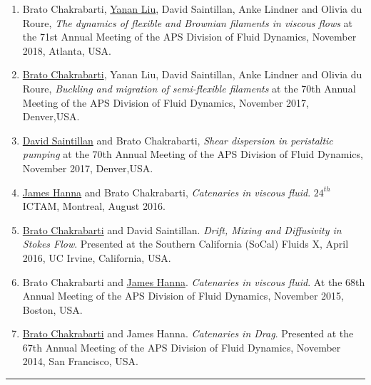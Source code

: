 \documentclass[10pt]{res} %
\begin{document}
\begin{resume}
\begin{enumerate}
\item Brato Chakrabarti, \underline{Yanan Liu}, David Saintillan, Anke Lindner and Olivia du Roure, \textit{The dynamics of flexible and Brownian filaments in viscous flows} at the 71st Annual Meeting of the APS Division of Fluid Dynamics, November 2018, Atlanta, USA. 

\item \underline{Brato Chakrabarti}, Yanan Liu, David Saintillan, Anke Lindner and Olivia du Roure, \textit{Buckling and migration of semi-flexible filaments} at the 70th Annual Meeting of the APS Division of Fluid Dynamics, November 2017,
Denver,USA. 

\item \underline{David Saintillan} and Brato Chakrabarti, \textit{Shear dispersion in peristaltic pumping} at the 70th Annual Meeting of the APS Division of Fluid Dynamics, November 2017,
Denver,USA. 

\item \underline{James Hanna} and Brato Chakrabarti, \textit{Catenaries in viscous fluid}. $24^{th}$ ICTAM, Montreal, August 2016.

\item \underline{Brato Chakrabarti} and David Saintillan. \textit{Drift, Mixing and Diffusivity in 
	Stokes Flow}. Presented at the Southern California (SoCal) Fluids X, April 2016, UC Irvine, California, USA.

\item Brato Chakrabarti and \underline{James Hanna}. \textit{Catenaries in viscous fluid}. At the 68th Annual Meeting of the APS Division of Fluid Dynamics, November 2015,
Boston, USA. 

\item \underline{Brato Chakrabarti} and James Hanna. \textit{Catenaries in Drag}. Presented at the 67th Annual Meeting of the APS Division of Fluid Dynamics, November 2014,
San Francisco, USA. 
	
\end{enumerate}

\vspace*{-2mm}
\noindent\rule{\textwidth}{0.6pt}
\vspace*{-7mm}
\section{}



\end{resume}
\end{document}
